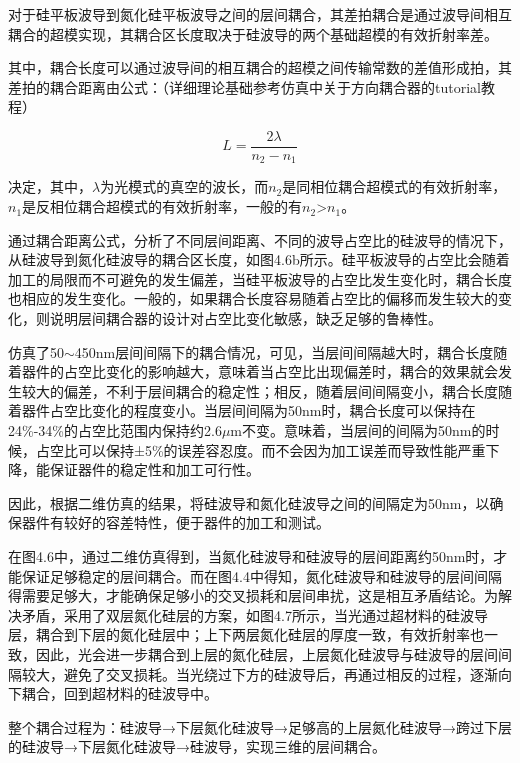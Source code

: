 对于硅平板波导到氮化硅平板波导之间的层间耦合，其差拍耦合是通过波导间相互耦合的超模实现，其耦合区长度取决于硅波导的两个基础超模的有效折射率差。

其中，耦合长度可以通过波导间的相互耦合的超模之间传输常数的差值形成拍，其差拍的耦合距离由公式：（详细理论基础参考仿真中关于方向耦合器的tutorial教程）

\begin{equation}
L =   \frac{2\lambda}{n_2-n_1}
\end{equation}

决定，其中，$\lambda$为光模式的真空的波长，而$n_2$是同相位耦合超模式的有效折射率，$n_1$是反相位耦合超模式的有效折射率，一般的有$n_2$>$n_1$。\cite{Foundations,Marcatili1969Dielectric,Trinh1995Integrated}

通过耦合距离公式，分析了不同层间距离、不同的波导占空比的硅波导的情况下，从硅波导到氮化硅波导的耦合区长度，如图4.6b所示。硅平板波导的占空比会随着加工的局限而不可避免的发生偏差，当硅平板波导的占空比发生变化时，耦合长度也相应的发生变化。一般的，如果耦合长度容易随着占空比的偏移而发生较大的变化，则说明层间耦合器的设计对占空比变化敏感，缺乏足够的鲁棒性。

仿真了50$\sim$450nm层间间隔下的耦合情况，可见，当层间间隔越大时，耦合长度随着器件的占空比变化的影响越大，意味着当占空比出现偏差时，耦合的效果就会发生较大的偏差，不利于层间耦合的稳定性；相反，随着层间间隔变小，耦合长度随着器件占空比变化的程度变小。当层间间隔为50nm时，耦合长度可以保持在24\%-34\%的占空比范围内保持约2.6$\mu$m不变。意味着，当层间的间隔为50nm的时候，占空比可以保持±5\%的误差容忍度。而不会因为加工误差而导致性能严重下降，能保证器件的稳定性和加工可行性。

因此，根据二维仿真的结果，将硅波导和氮化硅波导之间的间隔定为50nm，以确保器件有较好的容差特性，便于器件的加工和测试。

在图4.6中，通过二维仿真得到，当氮化硅波导和硅波导的层间距离约50nm时，才能保证足够稳定的层间耦合。而在图4.4中得知，氮化硅波导和硅波导的层间间隔得需要足够大，才能确保足够小的交叉损耗和层间串扰，这是相互矛盾结论。为解决矛盾，采用了双层氮化硅层的方案，如图4.7所示，当光通过超材料的硅波导层，耦合到下层的氮化硅层中；上下两层氮化硅层的厚度一致，有效折射率也一致，因此，光会进一步耦合到上层的氮化硅层，上层氮化硅波导与硅波导的层间间隔较大，避免了交叉损耗。当光绕过下方的硅波导后，再通过相反的过程，逐渐向下耦合，回到超材料的硅波导中。

整个耦合过程为：硅波导→下层氮化硅波导→足够高的上层氮化硅波导→跨过下层的硅波导→下层氮化硅波导→硅波导，实现三维的层间耦合。

